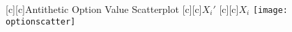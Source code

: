 \documentclass{standalone}
\begin{document}
[c][c]{Antithetic Option Value Scatterplot}
[c][c]{$X_i'$}
[c][c]{$X_i$}
\texttt{[image: optionscatter]}
\end{document}
